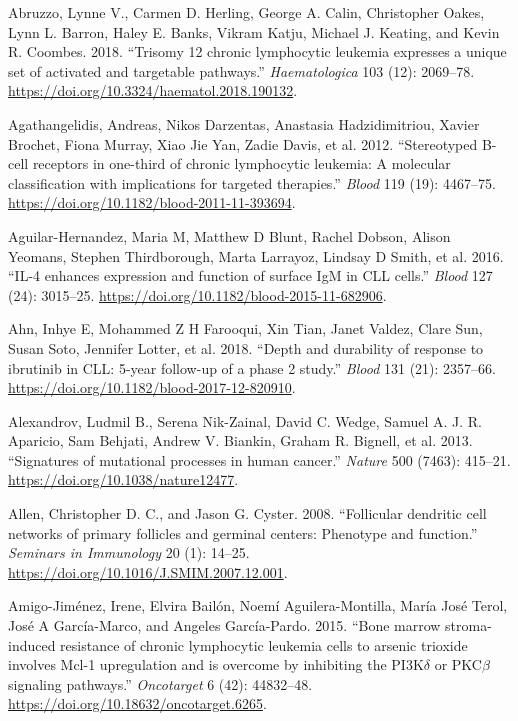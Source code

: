 \documentclass[11pt, a4paper, twosided]{book}
\newenvironment{CSLReferences}%
  {}%
  {\par}
\begin{document}
\hypertarget{refs}{}
\begin{CSLReferences}{1}{0}
\leavevmode{}%
Abruzzo, Lynne V., Carmen D. Herling, George A. Calin, Christopher Oakes, Lynn L. Barron, Haley E. Banks, Vikram Katju, Michael J. Keating, and Kevin R. Coombes. 2018. {``{Trisomy 12 chronic lymphocytic leukemia expresses a unique set of activated and targetable pathways}.''} \emph{Haematologica} 103 (12): 2069--78. \url{https://doi.org/10.3324/haematol.2018.190132}.

\leavevmode{}%
Agathangelidis, Andreas, Nikos Darzentas, Anastasia Hadzidimitriou, Xavier Brochet, Fiona Murray, Xiao Jie Yan, Zadie Davis, et al. 2012. {``{Stereotyped B-cell receptors in one-third of chronic lymphocytic leukemia: A molecular classification with implications for targeted therapies}.''} \emph{Blood} 119 (19): 4467--75. \url{https://doi.org/10.1182/blood-2011-11-393694}.

\leavevmode{}%
Aguilar-Hernandez, Maria M, Matthew D Blunt, Rachel Dobson, Alison Yeomans, Stephen Thirdborough, Marta Larrayoz, Lindsay D Smith, et al. 2016. {``{IL-4 enhances expression and function of surface IgM in CLL cells}.''} \emph{Blood} 127 (24): 3015--25. \url{https://doi.org/10.1182/blood-2015-11-682906}.

\leavevmode{}%
Ahn, Inhye E, Mohammed Z H Farooqui, Xin Tian, Janet Valdez, Clare Sun, Susan Soto, Jennifer Lotter, et al. 2018. {``{Depth and durability of response to ibrutinib in CLL: 5-year follow-up of a phase 2 study.}''} \emph{Blood} 131 (21): 2357--66. \url{https://doi.org/10.1182/blood-2017-12-820910}.

\leavevmode{}%
Alexandrov, Ludmil B., Serena Nik-Zainal, David C. Wedge, Samuel A. J. R. Aparicio, Sam Behjati, Andrew V. Biankin, Graham R. Bignell, et al. 2013. {``{Signatures of mutational processes in human cancer}.''} \emph{Nature} 500 (7463): 415--21. \url{https://doi.org/10.1038/nature12477}.

\leavevmode{}%
Allen, Christopher D. C., and Jason G. Cyster. 2008. {``{Follicular dendritic cell networks of primary follicles and germinal centers: Phenotype and function}.''} \emph{Seminars in Immunology} 20 (1): 14--25. \url{https://doi.org/10.1016/J.SMIM.2007.12.001}.

\leavevmode{}%
Amigo-Jiménez, Irene, Elvira Bailón, Noemí Aguilera-Montilla, María José Terol, José A García-Marco, and Angeles García-Pardo. 2015. {``{Bone marrow stroma-induced resistance of chronic lymphocytic leukemia cells to arsenic trioxide involves Mcl-1 upregulation and is overcome by inhibiting the PI3K\(\delta\) or PKC\(\beta\) signaling pathways}.''} \emph{Oncotarget} 6 (42): 44832--48. \url{https://doi.org/10.18632/oncotarget.6265}.


\end{CSLReferences}
\end{document}
